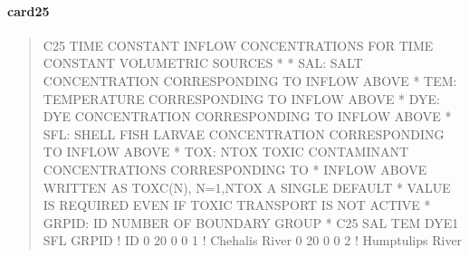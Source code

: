 \documentclass[letterpaper,10pt,english]{sphinxmanual}
\begin{document}
\paragraph{card25}
\label{\detokenize{inputfiles/runcontrol/card25:card25}}\label{\detokenize{inputfiles/runcontrol/card25::doc}}\begin{quote}

\begin{sphinxVerbatim}[commandchars=\\\{\}]
\PYGZhy{}\PYGZhy{}\PYGZhy{}\PYGZhy{}\PYGZhy{}\PYGZhy{}\PYGZhy{}\PYGZhy{}\PYGZhy{}\PYGZhy{}\PYGZhy{}\PYGZhy{}\PYGZhy{}\PYGZhy{}\PYGZhy{}\PYGZhy{}\PYGZhy{}\PYGZhy{}\PYGZhy{}\PYGZhy{}\PYGZhy{}\PYGZhy{}\PYGZhy{}\PYGZhy{}\PYGZhy{}\PYGZhy{}\PYGZhy{}\PYGZhy{}\PYGZhy{}\PYGZhy{}\PYGZhy{}\PYGZhy{}\PYGZhy{}\PYGZhy{}\PYGZhy{}\PYGZhy{}\PYGZhy{}\PYGZhy{}\PYGZhy{}\PYGZhy{}\PYGZhy{}\PYGZhy{}\PYGZhy{}\PYGZhy{}\PYGZhy{}\PYGZhy{}\PYGZhy{}\PYGZhy{}\PYGZhy{}\PYGZhy{}\PYGZhy{}\PYGZhy{}\PYGZhy{}\PYGZhy{}\PYGZhy{}\PYGZhy{}\PYGZhy{}\PYGZhy{}\PYGZhy{}\PYGZhy{}\PYGZhy{}\PYGZhy{}\PYGZhy{}\PYGZhy{}\PYGZhy{}\PYGZhy{}\PYGZhy{}\PYGZhy{}\PYGZhy{}\PYGZhy{}\PYGZhy{}\PYGZhy{}\PYGZhy{}\PYGZhy{}\PYGZhy{}\PYGZhy{}\PYGZhy{}\PYGZhy{}
C25 TIME CONSTANT INFLOW CONCENTRATIONS FOR TIME CONSTANT VOLUMETRIC SOURCES
*
*    SAL: SALT CONCENTRATION CORRESPONDING TO INFLOW ABOVE
*    TEM: TEMPERATURE CORRESPONDING TO INFLOW ABOVE
*    DYE: DYE CONCENTRATION CORRESPONDING TO INFLOW ABOVE
*    SFL: SHELL FISH LARVAE CONCENTRATION CORRESPONDING TO INFLOW ABOVE
*    TOX: NTOX TOXIC CONTAMINANT CONCENTRATIONS CORRESPONDING TO
*         INFLOW ABOVE  WRITTEN AS TOXC(N), N=1,NTOX A SINGLE DEFAULT
*         VALUE IS REQUIRED EVEN IF TOXIC TRANSPORT IS NOT ACTIVE
*  GRPID: ID NUMBER OF BOUNDARY GROUP
*
C25       SAL       TEM      DYE1       SFL      GRPID ! ID
            0        20         0         0          1 ! Chehalis River
            0        20         0         0          2 ! Humptulips River
\end{sphinxVerbatim}
\end{quote}
\end{document}
